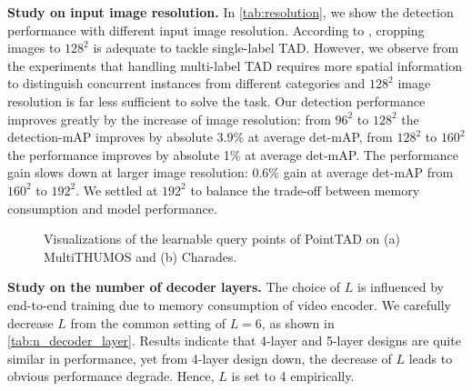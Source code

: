 \documentclass{article}
\renewcommand{\paragraph}[1]{\vspace{1.25mm}\noindent\textbf{#1}}
\begin{document}
\paragraph{Study on input image resolution.}
In \cref{tab:resolution}, we show the detection performance with different input image resolution. According to \cite{liu2022an}, cropping images to $128^2$ is adequate to tackle single-label TAD. However, we observe from the experiments that handling multi-label TAD requires more spatial information to distinguish concurrent instances from different categories and $128^2$ image resolution is far less sufficient to solve the task. Our detection performance improves greatly by the increase of image resolution: from $96^2$ to $128^2$ the detection-mAP improves by absolute 3.9\% at average det-mAP, from $128^2$ to $160^2$ the performance improves by absolute 1\% at average det-mAP. The performance gain slows down at larger image resolution: 0.6\% gain at average det-mAP from $160^2$ to $192^2$. We settled at $192^2$ to balance the trade-off between memory consumption and model performance.

\begin{figure*}[h]
\centering
{}
\hspace{2em}

\caption{ Visualizations of the learnable query points of PointTAD on (a) MultiTHUMOS and (b) Charades.}
\label{fig:concurrent}
\end{figure*}

\paragraph{Study on the number of decoder layers.}
The choice of $L$ is influenced by end-to-end training due to memory consumption of video encoder. We carefully decrease $L$ from the common setting of $L = 6$, as shown in \cref{tab:n_decoder_layer}. Results indicate that 4-layer and 5-layer designs are quite similar in performance, yet from 4-layer design down, the decrease of $L$ leads to obvious performance degrade. Hence, $L$ is set to 4 empirically.
\end{document}
